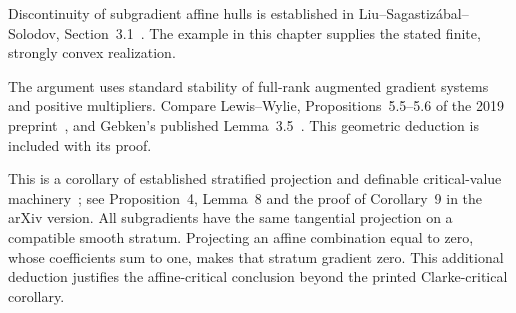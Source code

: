 Discontinuity of subgradient affine hulls is established in Liu--Sagastiz\'abal--Solodov, Section~3.1~\cite{geom_LSS2019}. The example in this chapter supplies the stated finite, strongly convex realization.

The argument uses standard stability of full-rank augmented gradient systems and positive multipliers. Compare Lewis--Wylie, Propositions~5.5--5.6 of the 2019 preprint~\cite{LW}, and Gebken's published Lemma~3.5~\cite{BG}. This geometric deduction is included with its proof.

This is a corollary of established stratified projection and definable critical-value machinery~\cite{BDLS}; see Proposition~4, Lemma~8 and the proof of Corollary~9 in the arXiv version. All subgradients have the same tangential projection on a compatible smooth stratum. Projecting an affine combination equal to zero, whose coefficients sum to one, makes that stratum gradient zero. This additional deduction justifies the affine-critical conclusion beyond the printed Clarke-critical corollary.
